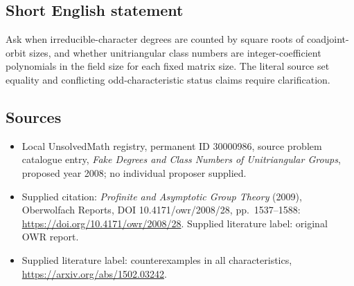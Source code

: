 \documentclass[11pt]{article}
\begin{document}
\subsection{Short English statement}
Ask when irreducible-character degrees are counted by square roots of coadjoint-orbit sizes, and whether unitriangular class numbers are integer-coefficient polynomials in the field size for each fixed matrix size. The literal source set equality and conflicting odd-characteristic status claims require clarification.
\subsection{Sources}
\begin{itemize}\item Local UnsolvedMath registry, permanent ID 30000986, source problem catalogue entry, \emph{Fake Degrees and Class Numbers of Unitriangular Groups}, proposed year 2008; no individual proposer supplied.\item Supplied citation: \emph{Profinite and Asymptotic Group Theory} (2009), Oberwolfach Reports, DOI 10.4171/owr/2008/28, pp.\ 1537--1588: \url{https://doi.org/10.4171/owr/2008/28}. Supplied literature label: original OWR report.\item Supplied literature label: counterexamples in all characteristics, \url{https://arxiv.org/abs/1502.03242}.\end{itemize}
\end{document}
